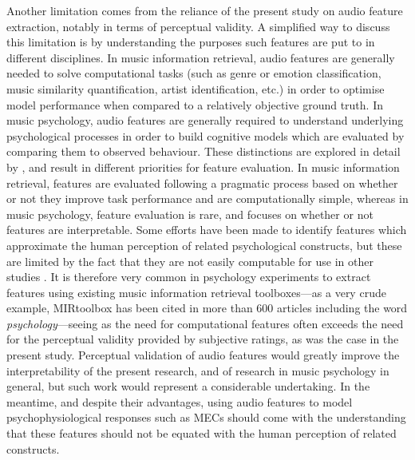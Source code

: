 Another limitation comes from the reliance of the present study on audio feature extraction, notably in terms of perceptual validity. A simplified way to discuss this limitation is by understanding the purposes such features are put to in different disciplines. In music information retrieval, audio features are generally needed to solve computational tasks (such as genre or emotion classification, music similarity quantification, artist identification, etc.) in order to optimise model performance when compared to a relatively objective ground truth. In music psychology, audio features are generally required to understand underlying psychological processes in order to build cognitive models which are evaluated by comparing them to observed behaviour. These distinctions are explored in detail by \textcite{aucouturier2012,aucouturier2013}, and result in different priorities for feature evaluation. In music information retrieval, features are evaluated following a pragmatic process based on whether or not they improve task performance and are computationally simple, whereas in music psychology, feature evaluation is rare, and focuses on whether or not features are interpretable. Some efforts have been made to identify features which approximate the human perception of related psychological constructs, but these are limited by the fact that they are not easily computable for use in other studies \parencite[e.g.,][]{aljanaki2018,friberg2014}. It is therefore very common in psychology experiments to extract features using existing music information retrieval toolboxes---as a very crude example, MIRtoolbox \parencite{lartillot2008} has been cited in more than 600 articles including the word \emph{psychology}---seeing as the need for computational features often exceeds the need for the perceptual validity provided by subjective ratings, as was the case in the present study. Perceptual validation of audio features would greatly improve the interpretability of the present research, and of research in music psychology in general, but such work would represent a considerable undertaking. In the meantime, and despite their advantages, using audio features to model psychophysiological responses such as MECs should come with the understanding that these features should not be equated with the human perception of related constructs.

